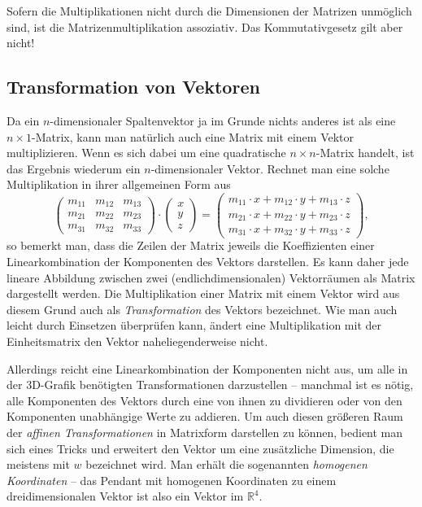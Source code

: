 Sofern die Multiplikationen nicht durch die Dimensionen der Matrizen unmöglich sind, ist die Matrizenmultiplikation assoziativ. Das Kommutativgesetz gilt aber nicht! 

\subsection{Transformation von Vektoren}
Da ein $n$-dimensionaler Spaltenvektor ja im Grunde nichts anderes ist als eine $n \times 1$-Matrix, kann man natürlich auch eine Matrix mit einem Vektor multiplizieren. Wenn es sich dabei um eine quadratische $n \times n$-Matrix handelt, ist das Ergebnis wiederum ein $n$-dimensionaler Vektor. Rechnet man eine solche Multiplikation in ihrer allgemeinen Form aus
\begin{equation}
 \begin{pmatrix}
  m_{11} & m_{12} & m_{13} \\
  m_{21} & m_{22} & m_{23} \\
  m_{31} & m_{32} & m_{33}
 \end{pmatrix} \cdot
 \begin{pmatrix}
  x \\ y \\ z
 \end{pmatrix} =
 \begin{pmatrix}
  m_{11} \cdot x + m_{12} \cdot y + m_{13} \cdot z \\
  m_{21} \cdot x + m_{22} \cdot y + m_{23} \cdot z \\
  m_{31} \cdot x + m_{32} \cdot y + m_{33} \cdot z
 \end{pmatrix},
\end{equation}
so bemerkt man, dass die Zeilen der Matrix jeweils die Koeffizienten einer Linearkombination der Komponenten des Vektors darstellen. Es kann daher jede lineare Abbildung zwischen zwei (endlichdimensionalen) Vektorräumen als Matrix dargestellt werden. Die Multiplikation einer Matrix mit einem Vektor wird aus diesem Grund auch als \emph{Transformation} des Vektors bezeichnet. Wie man auch leicht durch Einsetzen überprüfen kann, ändert eine Multiplikation mit der Einheitsmatrix den Vektor naheliegenderweise nicht.

\label{homogeneouscoordinates}
Allerdings reicht eine Linearkombination der Komponenten nicht aus, um alle in der 3D-Grafik benötigten Transformationen darzustellen -- manchmal ist es nötig, alle Komponenten des Vektors durch eine von ihnen zu dividieren oder von den Komponenten unabhängige Werte zu addieren. Um auch diesen größeren Raum der \emph{affinen Transformationen} in Matrixform darstellen zu können, bedient man sich eines Tricks und erweitert den Vektor um eine zusätzliche Dimension, die meistens mit $w$ bezeichnet wird. Man erhält die sogenannten \emph{homogenen Koordinaten} -- das Pendant mit homogenen Koordinaten zu einem dreidimensionalen Vektor ist also ein Vektor im $\mathbb{R}^4$.

